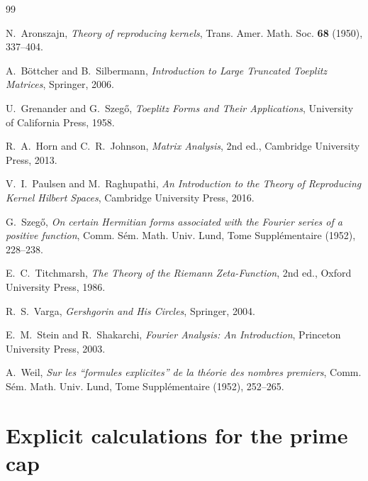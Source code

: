 \documentclass[11pt,a4paper]{article}
\theoremstyle{definition}
\theoremstyle{remark}
\begin{document}

\begin{thebibliography}{99}

N.~Aronszajn, \emph{Theory of reproducing kernels}, Trans. Amer. Math. Soc. \textbf{68} (1950), 337--404.

A.~B\"ottcher and B.~Silbermann, \emph{Introduction to Large Truncated Toeplitz Matrices}, Springer, 2006.

U.~Grenander and G.~Szeg\H{o}, \emph{Toeplitz Forms and Their Applications}, University of California Press, 1958.

R.~A.~Horn and C.~R.~Johnson, \emph{Matrix Analysis}, 2nd ed., Cambridge University Press, 2013.

V.~I.~Paulsen and M.~Raghupathi, \emph{An Introduction to the Theory of Reproducing Kernel Hilbert Spaces}, Cambridge University Press, 2016.

G.~Szeg\H{o}, \emph{On certain Hermitian forms associated with the Fourier series of a positive function}, Comm. S\'em. Math. Univ. Lund, Tome Suppl\'ementaire (1952), 228--238.

E.~C.~Titchmarsh, \emph{The Theory of the Riemann Zeta-Function}, 2nd ed., Oxford University Press, 1986.

R.~S.~Varga, \emph{Gershgorin and His Circles}, Springer, 2004.

E.~M.~Stein and R.~Shakarchi, \emph{Fourier Analysis: An Introduction}, Princeton University Press, 2003.

A.~Weil, \emph{Sur les ``formules explicites'' de la th\'eorie des nombres premiers}, Comm. S\'em. Math. Univ. Lund, Tome Suppl\'ementaire (1952), 252--265.

\end{thebibliography}

\appendix
\section{Explicit calculations for the prime cap}\label{app:explicit}
\end{document}
